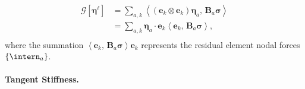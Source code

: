 \begin{equation}
\begin{aligned}
\mathcal{G}\left[\bm{\eta}^\ell\right]
&= \sum_{a,k} \left<\left(\mathbf{e}_k\otimes\mathbf{e}_k\right) \bm{\eta}_a,\, \bm{B}_a  \bm{\sigma} \right> \\
&= \sum_{a,k} \bm{\eta}_a \cdot \mathbf{e}_k  \left<\mathbf{e}_k ,\, \bm{B}_a  \bm{\sigma} \right>, \\
\end{aligned}
\label{eq:global-work-dot}
\end{equation}
where the summation \(\left<\mathbf{e}_k ,\,\bm{B}_a  \bm{\sigma} \right> \mathbf{e}_k\) 
represents the residual element nodal forces \(\{\intern_a\}\).


\paragraph{Tangent Stiffness.}

